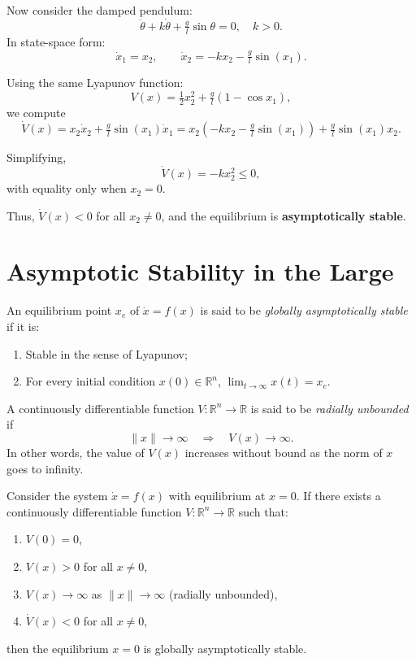 \begin{example}
Now consider the damped pendulum:
\[
    \ddot{\theta} + k\dot{\theta} + \tfrac{g}{l}\sin\theta = 0, \quad k>0.
\]
In state-space form:
\[
    \dot{x}_1 = x_2, 
    \qquad 
    \dot{x}_2 = -k x_2 - \tfrac{g}{l}\sin(x_1).
\]

Using the same Lyapunov function:
\[
    V(x) = \tfrac{1}{2}x_2^2 + \tfrac{g}{l}(1-\cos x_1),
\]
we compute
\[
    \dot V(x) = x_2\dot{x}_2 + \tfrac{g}{l}\sin(x_1)\dot{x}_1
    = x_2(-k x_2 - \tfrac{g}{l}\sin(x_1)) + \tfrac{g}{l}\sin(x_1)x_2.
\]

Simplifying,
\[
    \dot V(x) = -k x_2^2 \leq 0,
\]
with equality only when $x_2=0$.  

Thus, $\dot V(x)<0$ for all $x_2 \neq 0$, and the equilibrium is \textbf{asymptotically stable}.
\end{example}

\newpage
\section{Asymptotic Stability in the Large}

\begin{definition}
	An equilibrium point $x_e$ of $\dot{x}=f(x)$ is said to be \emph{globally asymptotically stable} if it is:
	\begin{enumerate}
		\item Stable in the sense of Lyapunov;
		\item For every initial condition $x(0)\in \mathbb{R}^n$, $\lim_{t\to\infty}x(t)=x_e$.
	\end{enumerate}
\end{definition}

\begin{definition}
	A continuously differentiable function $V:\mathbb{R}^n \to \mathbb{R}$ is said to be \emph{radially unbounded} if
	\begin{equation}
		\|x\| \to \infty \quad \Rightarrow \quad V(x)\to \infty.
	\end{equation}
	In other words, the value of $V(x)$ increases without bound as the norm of $x$ goes to infinity.
\end{definition}

\begin{theorem}
	Consider the system $\dot{x}=f(x)$ with equilibrium at $x=0$.  
	If there exists a continuously differentiable function $V:\mathbb{R}^n \to \mathbb{R}$ such that:
	\begin{enumerate}
		\item $V(0)=0$,
		\item $V(x)>0$ for all $x\neq 0$,
		\item $V(x)\to \infty$ as $\|x\|\to \infty$ (radially unbounded),
		\item $\dot{V}(x)<0$ for all $x\neq 0$,
	\end{enumerate}
	then the equilibrium $x=0$ is globally asymptotically stable.
\end{theorem}

